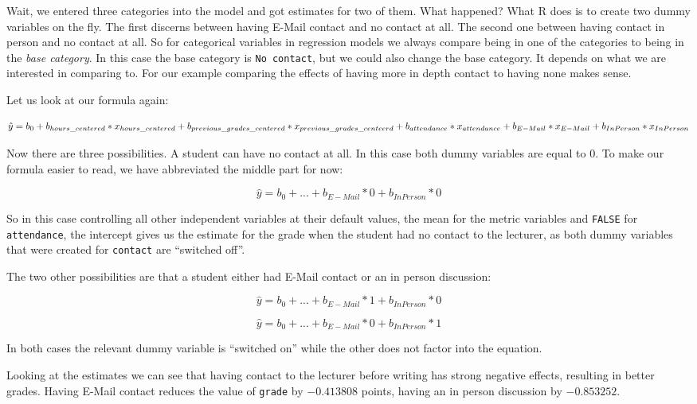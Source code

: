 \documentclass[
]{book}
\begin{document}
Wait, we entered three categories into the model and got estimates for two of
them. What happened? What R does is to create two dummy variables on the fly.
The first discerns between having E-Mail contact and no contact at all. The
second one between having contact in person and no contact at all. So for
categorical variables in regression models we always compare being in one of the
categories to being in the \emph{base category}. In this case the base category is
\texttt{No\ contact}, but we could also change the base category. It depends on what we
are interested in comparing to. For our example comparing the effects of having
more in depth contact to having none makes sense.

Let us look at our formula again:

\[\hat{y} = b_0 + b_{hours\_centered}*x_{hours\_centered} +\\
b_{previous\_grades\_centered} * x_{previous\_grades\_centeerd} +\\
b_{attendance} * x_{attendance} +\\
b_{E-Mail} * x_{E-Mail} + b_{In Person} * x_{In Person}\]

Now there are three possibilities. A student can have no contact at all. In this
case both dummy variables are equal to \(0\). To make our formula easier to read, we have
abbreviated the middle part for now:

\[\hat{y} = b_0 + ... + b_{E-Mail} * 0 + b_{In Person} * 0\]

So in this case controlling all other independent variables at their default
values, the mean for the metric variables and \texttt{FALSE} for \texttt{attendance}, the
intercept gives us the estimate for the grade when the student had no contact to
the lecturer, as both dummy variables that were created for \texttt{contact} are ``switched off''.

The two other possibilities are that a student either had E-Mail contact or an
in person discussion:

\[\hat{y} = b_0 + ... + b_{E-Mail} * 1 + b_{In Person} * 0\]

\[\hat{y} = b_0 + ... + b_{E-Mail} * 0 + b_{In Person} * 1\]

In both cases the relevant dummy variable is ``switched on'' while the other does
not factor into the equation.

Looking at the estimates we can see that having contact to the lecturer before
writing has strong negative effects, resulting in better grades. Having E-Mail
contact reduces the value of \texttt{grade} by \(-0.413808\) points, having an in person
discussion by \(-0.853252\).
\end{document}
